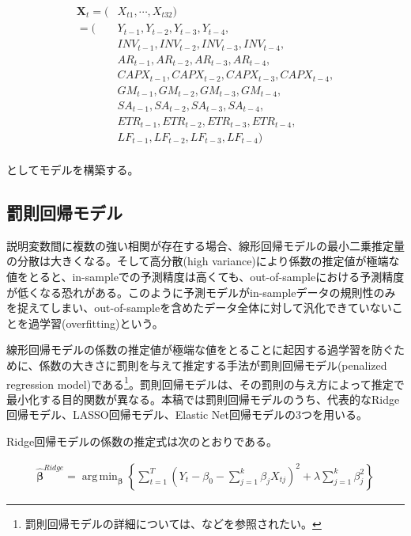 \documentclass[a4paper, 12pt]{jsreport}
\DeclareMathOperator*{\argmin}{arg\,min}
\begin{document}
\begin{equation}
  \begin{split}
    \bm{X}_t = (&X_{t1}, \cdots ,X_{t32}) \\ 
    =(&Y_{t-1}, Y_{t-2}, Y_{t-3}, Y_{t-4}, \\
    & INV_{t-1}, INV_{t-2}, INV_{t-3}, INV_{t-4}, \\
    & AR_{t-1}, AR_{t-2}, AR_{t-3}, AR_{t-4}, \\
    & CAPX_{t-1}, CAPX_{t-2}, CAPX_{t-3}, CAPX_{t-4}, \\
    & GM_{t-1}, GM_{t-2}, GM_{t-3}, GM_{t-4}, \\
    & SA_{t-1}, SA_{t-2}, SA_{t-3}, SA_{t-4}, \\
    & ETR_{t-1}, ETR_{t-2}, ETR_{t-3}, ETR_{t-4}, \\ 
    & LF_{t-1}, LF_{t-2}, LF_{t-3}, LF_{t-4}) \\
  \end{split}
\end{equation}

としてモデルを構築する。

\subsection{罰則回帰モデル}

説明変数間に複数の強い相関が存在する場合、線形回帰モデルの最小二乗推定量の分散は大きくなる。そして高分散(high variance)により係数の推定値が極端な値をとると、in-sampleでの予測精度は高くても、out-of-sampleにおける予測精度が低くなる恐れがある。このように予測モデルがin-sampleデータの規則性のみを捉えてしまい、out-of-sampleを含めたデータ全体に対して汎化できていないことを過学習(overfitting)という。

線形回帰モデルの係数の推定値が極端な値をとることに起因する過学習を防ぐために、係数の大きさに罰則を与えて推定する手法が罰則回帰モデル(penalized regression model)である\footnote{罰則回帰モデルの詳細については、\cite*{hoerl1970ridge, tibshirani1996regression, zou2005regularization}などを参照されたい。}。罰則回帰モデルは、その罰則の与え方によって推定で最小化する目的関数が異なる。本稿では罰則回帰モデルのうち、代表的なRidge回帰モデル、LASSO回帰モデル、Elastic Net回帰モデルの3つを用いる。

Ridge回帰モデルの係数の推定式は次のとおりである。

\begin{equation} \label{ridge}
  \begin{split}
    \hat{\bm{\beta}}^{Ridge} = \argmin_{\bm{\beta}}\left\{ \sum_{t=1}^{T} \left( Y_t - \beta_0 - \sum_{j=1}^{k} \beta_{j} X_{tj} \right)^2 + \lambda \sum_{j=1}^{k} \beta_{j}^{2} \right\}
  \end{split}
\end{equation}
\end{document}
